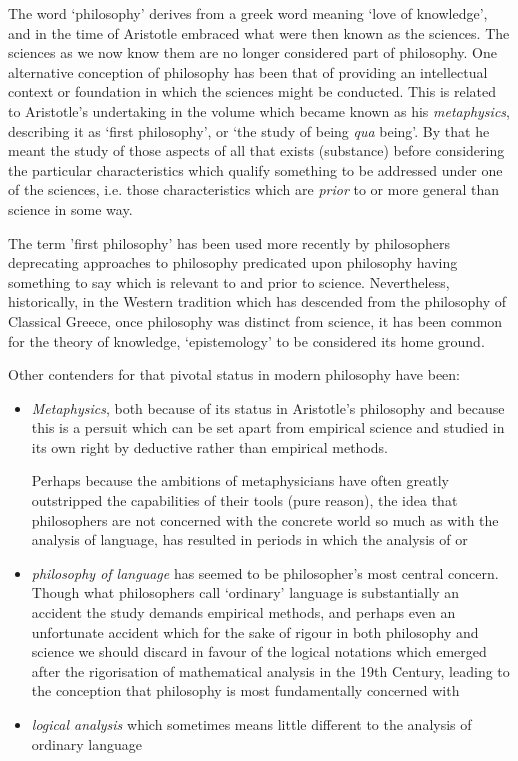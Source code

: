 The word `philosophy' derives from a greek word meaning `love of knowledge', and in the time of Aristotle embraced what were then known as the sciences.
The sciences as we now know them are no longer considered part of philosophy.
One alternative conception of philosophy has been that of providing an intellectual context or foundation in which the sciences might be conducted.
This is related to Aristotle's undertaking in the volume which became known as his \emph{metaphysics}, describing it as `first philosophy', or `the study of being \emph{qua} being'.
By that he meant the study of those aspects of all that exists (substance) before considering the particular characteristics which qualify something to be addressed under one of the sciences, i.e. those characteristics which are \emph{prior} to or more general than science in some way.

The term 'first philosophy' has been used more recently by philosophers deprecating approaches to philosophy predicated upon philosophy having something to say which is relevant to and prior to science.
Nevertheless, historically, in the Western tradition which has descended from the philosophy of Classical Greece, once philosophy was distinct from science, it has been common for the theory of knowledge, `epistemology' to be considered its home ground.

Other contenders for that pivotal status in modern philosophy have been:
\begin{itemize}
\item \emph{Metaphysics}, both because of its status in Aristotle's philosophy and because this is a persuit which can be set apart from empirical science and studied in its own right by deductive rather than empirical methods.
  
  Perhaps because the ambitions of metaphysicians have often greatly outstripped the capabilities of their tools (pure reason), the idea that philosophers are not concerned with the concrete world so much as with the analysis of language, has resulted in periods in which the analysis of or
  \item \emph{philosophy of language} has seemed to be philosopher's most central concern.
    Though what philosophers call `ordinary' language is substantially an accident the study demands empirical methods, and perhaps even an unfortunate accident which for the sake of rigour in both philosophy and science we should discard in favour of the logical notations which emerged after the rigorisation of mathematical analysis in the 19th Century, leading to the conception that philosophy is most fundamentally concerned with
  \item \emph{logical analysis}
    which sometimes means little different to the analysis of ordinary language
\end{itemize}

